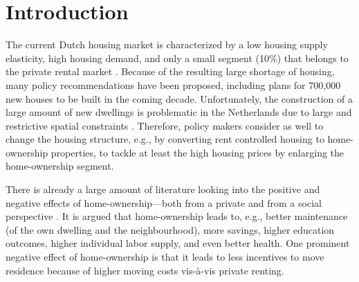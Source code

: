 \documentclass[fleqn,10pt]{SelfArx} %
\affiliation{\textsuperscript{1}\textit{Department of Spatial Economics, Vrije Universiteit Amsterdam, Amsterdam, The Netherlands}} %
\affiliation{*\textbf{Corresponding author}: \Letter{} t.de.graaff@vu.n; \Mundus{} \href{thomasdegraaff.nl}{thomasdegraaff.nl}} %
\begin{document}
	
	\flushbottom %
	\maketitle %
	\thispagestyle{empty} %
	
	
	\section{Introduction} %

    The current Dutch housing market is characterized by a low housing supply
    elasticity, high housing demand, and only a small segment (10\%) that
    belongs to the private rental market \citep{michielsen2017}. Because of the
    resulting large shortage of housing, many policy recommendations have been
    proposed, including plans for 700,000 new houses to be built in the coming
    decade. Unfortunately, the construction of a large amount of new dwellings
    is problematic in the Netherlands due to large and restrictive spatial
    constraints \citep{michielsen2019}. Therefore, policy makers consider as
    well to change the housing structure, e.g., by converting rent controlled
    housing to home-ownership properties, to tackle at least the high housing
    prices by enlarging the home-ownership segment.
        
    There is already a large amount of literature looking into the positive and
    negative effects of home-ownership---both from a private and from a social
    perspective \citep[see for an overview][]{dietz2003social}. It is argued
    that home-ownership leads to, e.g., better maintenance (of the own dwelling
    and the neighbourhood), more savings, higher education outcomes, higher
    individual labor supply, and even better health. One prominent negative
    effect of home-ownership is that it leads to less incentives to move
    residence because of higher moving costs vis-\`{a}-vis private renting.
        
\end{document}
